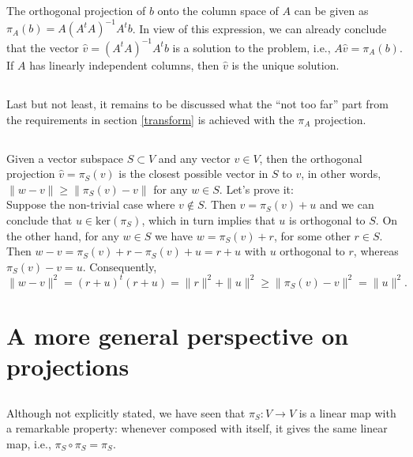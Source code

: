 \documentclass{proc-l}
\theoremstyle{definition}
\theoremstyle{remark}
\numberwithin{equation}{section}
\renewcommand{\ker}[1]{\textrm{ker}({#1})}
\begin{document}
\subsection{}
The orthogonal projection of $b$ onto the column space of $A$ can be given as $\pi_A(b) = A(A^tA)^{-1}A^tb$. In view of this expression, we can already conclude that the vector $\hat v = (A^tA)^{-1}A^tb$ is a solution to the problem, i.e., $A\hat v = \pi_A(b)$. If $A$ has linearly independent columns, then $\hat v$ is the unique solution.

\subsection{}
Last but not least, it remains to be discussed what the ``not too far'' part from the requirements in section \ref{transform} is achieved with the $\pi_A$ projection.

\subsection{}
Given a vector subspace $S\subset V$ and any vector $v\in V$, then the orthogonal projection $\hat v = \pi_S(v)$ is the closest possible vector in $S$ to $v$, in other words, $\|w-v\| \geq \|\pi_S(v) - v\|$ for any $w\in S$. Let's prove it:
\\

\noindent
Suppose the non-trivial case where $v\notin S$. Then $v = \pi_S(v) + u$ and we can conclude that $u\in\ker{\pi_S}$, which in turn implies that $u$ is orthogonal to $S$. On the other hand, for any $w\in S$ we have $w = \pi_S(v) + r$, for some other $r\in S$. Then $w - v = \pi_S(v) + r - \pi_S(v) + u = r + u$ with $u$ orthogonal to $r$, whereas $\pi_S(v) - v = u$. Consequently,
\[
\|w - v\|^2 = (r + u)^t(r + u) = \|r\|^2 + \|u\|^2 \geq \|\pi_S(v) - v\|^2 = \|u\|^2.
\]

\section{A more general perspective on projections}
\subsection{}\label{projection}
Although not explicitly stated, we have seen that $\pi_S:V\to V$ is a linear map with a remarkable property: whenever composed with itself, it gives the same linear map, i.e., $\pi_S \circ \pi_S = \pi_S$. 
\end{document}
